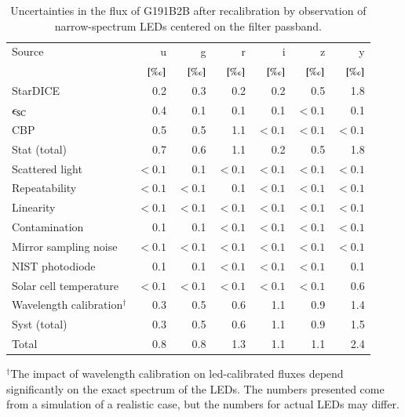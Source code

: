 \begin{table}
  \centering
  \caption{Uncertainties in the flux of G191B2B after recalibration by observation of narrow-spectrum LEDs centered on the filter passband.}
  \label{tab:led}
  \begin{tabular}{@{}l@{}r@{}r@{}r@{}r@{}r@{}r@{}}
    \toprule
    Source & u & g & r & i & z & y \\
           & $[\text{\textperthousand}]$ & $[\text{\textperthousand}]$ & $[\text{\textperthousand}]$ & $[\text{\textperthousand}]$ & $[\text{\textperthousand}]$ & $[\text{\textperthousand}]$\\
    \midrule
    StarDICE & 0.2 & 0.3 & 0.2 & 0.2 & 0.5 & 1.8 \\
    $\epsilon_{\mathrm{SC}}$ & 0.4 & 0.1 & 0.1 & 0.1 & $<0.1$ & 0.1 \\
    CBP & 0.5 & 0.5 & 1.1 & $<0.1$ & $<0.1$ & $<0.1$ \\
    \midrule
    Stat (total) & 0.7 & 0.6 & 1.1 & 0.2 & 0.5 & 1.8 \\
    \midrule
    Scattered light & $<0.1$ & 0.1 & $<0.1$ & $<0.1$ & $<0.1$ & $<0.1$ \\
    Repeatability & $<0.1$ & $<0.1$ & 0.1 & $<0.1$ & $<0.1$ & $<0.1$ \\
    Linearity & $<0.1$ & $<0.1$ & $<0.1$ & $<0.1$ & $<0.1$ & $<0.1$ \\
    Contamination & 0.1 & 0.1 & $<0.1$ & $<0.1$ & $<0.1$ & $<0.1$ \\
    Mirror sampling noise & $<0.1$ & $<0.1$ & $<0.1$ & $<0.1$ & $<0.1$ & $<0.1$ \\
    NIST photodiode & 0.1 & 0.1 & $<0.1$ & $<0.1$ & $<0.1$ & 0.1 \\
    Solar cell temperature & $<0.1$ & $<0.1$ & $<0.1$ & $<0.1$ & $<0.1$ & 0.6 \\
    Wavelength calibration$^\dag$ & 0.3 & 0.5 & 0.6 & 1.1 & 0.9 & 1.4 \\
    \midrule
    Syst (total) & 0.3 & 0.5 & 0.6 & 1.1 & 0.9 & 1.5 \\
    \midrule
    Total & 0.8 & 0.8 & 1.3 & 1.1 & 1.1 & 2.4 \\
    \bottomrule
  \end{tabular}
  \begin{tablenotes}
    \item $^\dag$The impact of wavelength calibration on
    led-calibrated fluxes depend significantly on the exact spectrum
    of the LEDs. The numbers presented come from a simulation of a
    realistic case, but the numbers for actual LEDs may differ.
  \end{tablenotes}
\end{table}


